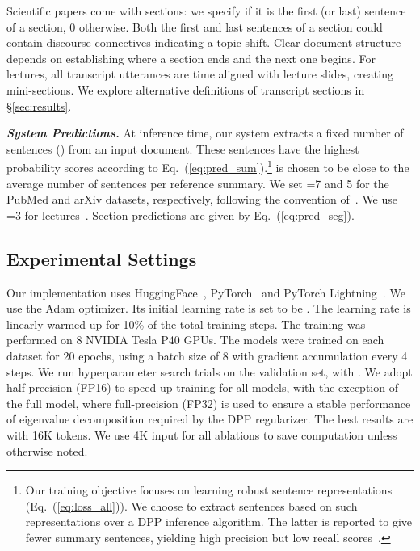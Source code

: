 \documentclass[11pt]{article}
\begin{document}
Scientific papers come with sections:
we specify  if it is the first (or last) sentence of a section, 0 otherwise.
Both the first and last sentences of a section could contain discourse connectives indicating a topic shift.
Clear document structure depends on establishing where a section ends and the next one begins.
For lectures, all transcript utterances are time aligned with lecture slides, 
creating mini-sections. 
We explore alternative definitions of transcript sections in \S\ref{sec:results}.


\vspace{0.04in}
\noindent\textbf{\textsl{System Predictions.}}\quad
At inference time, our system extracts a fixed number of sentences () from an input document.
These sentences have the highest probability scores according to Eq.~(\ref{eq:pred_sum}).\footnote{
Our training objective focuses on learning robust sentence representations (Eq.~(\ref{eq:loss_all})).
We choose to extract sentences based on such representations over a DPP inference algorithm. 
The latter is reported to give fewer summary sentences, yielding high precision but low recall scores~\cite{Zhang:2016:DPP}.
}
 is chosen to be close to the average number of sentences per reference summary.
We set =7 and 5 for the PubMed and arXiv datasets, respectively, following the convention of~\citet{xiao-carenini-2019-extractive}.
We use =3 for lectures~\cite{lv2021vt}.
Section predictions are given by Eq.~(\ref{eq:pred_seg}).


\subsection{Experimental Settings}
\label{sec:settings}

Our implementation uses HuggingFace~\cite{wolf-etal-2020-transformers}, PyTorch~\cite{PyTorch:NEURIPS2019_9015} and PyTorch Lightning~\cite{falcon2019pytorch}.
We use the Adam optimizer. Its initial learning rate is set to be . The learning rate is linearly warmed up for 10\% of the total training steps.
The training was performed on 8 NVIDIA Tesla P40 GPUs.
The models were trained on each dataset for 20 epochs,
using a batch size of 8 with gradient accumulation every 4 steps.
We run hyperparameter search trials on the validation set, with .
We adopt half-precision (FP16) to speed up training for all models,
with the exception of the full model, 
where full-precision (FP32) is used to ensure a stable performance of eigenvalue decomposition required by the DPP regularizer. 
The best results are with 16K tokens.
We use 4K input for all ablations to save computation unless otherwise noted.
\end{document}
